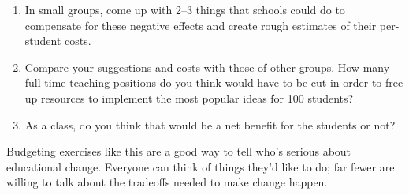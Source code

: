 \begin{enumerate}

\item
  In small groups,
  come up with 2--3 things that schools could do to compensate for these negative effects
  and create rough estimates of their per-student costs.

\item
  Compare your suggestions and costs with those of other groups.
  How many full-time teaching positions do you think would have to be cut
  in order to free up resources to implement the most popular ideas for 100 students?

\item
  As a class,
  do you think that would be a net benefit for the students or not?

\end{enumerate}

Budgeting exercises like this are a good way to tell who's serious about educational change.
Everyone can think of things they'd like to do;
far fewer are willing to talk about the tradeoffs needed to make change happen.
